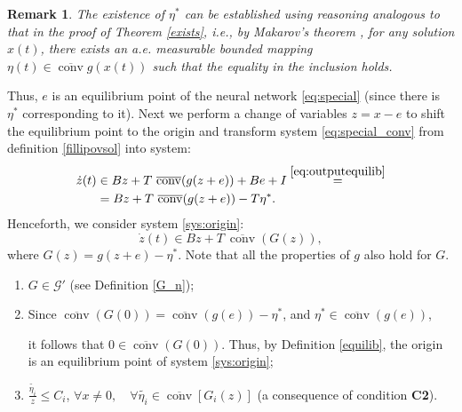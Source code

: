 \documentclass[journal]{IEEEtran}
\newtheorem{remark}{Remark}
\begin{document}
\begin{remark}
{The existence of $\eta^*$ can be established using reasoning analogous to that in the proof of Theorem \ref{exists}, 
i.e., by Makarov’s theorem \cite[p. 38, Th. 1.7]{Leonov}, for any solution $x(t)$, 
there exists an a.e. measurable bounded mapping $\eta(t) \in \overline{\operatorname{conv}}g(x(t))$ such that the equality in the inclusion holds.}
\end{remark}

Thus, $e$ is an equilibrium point of the neural network \eqref{eq:special} (since there is $\eta^*$ corresponding to it). 
Next we perform a change of variables $z=x-e$ to shift the equilibrium point to the origin and transform system \eqref{eq:special_conv} from definition \ref{fillipovsol} into system:
\[
\begin{aligned}
    \dot z(t) &\in Bz+ T~ \overline{\operatorname{conv}}(g(z+e))+Be+I\overset{\eqref{eq:outputequilib}}{=}\\
    &= Bz+T~ \overline{\operatorname{conv}}(g(z+e)) - T\eta^*.\\
\end{aligned}
\]
Henceforth, we consider system \eqref{sys:origin}:
\begin{equation}\label{sys:origin}
\dot z(t) \in Bz+T~ \overline{\operatorname{conv}}(G(z)),
\end{equation}
where $G(z)=g(z+e)-\eta^*$. Note that all the properties of $g$ also hold for $G$.

\begin{enumerate}
    \item $G\in \mathcal{G'}$ (see Definition \ref{G_n});
    
    \item Since $\overline{\operatorname{conv}}(G(0))=\overline{\operatorname{conv}}(g(e)) -\eta^*$, and $\eta^* \in \overline{\operatorname{conv}}(g(e))$, 
    
    it follows that $0 \in \overline{\operatorname{conv}}(G(0))$. Thus, by Definition \ref{equilib}, the origin is an equilibrium point of system \eqref{sys:origin};
    \item $ \frac{ \widetilde{\eta_i}}{z} \leqslant C_i $, $\forall x \ne 0, \quad \forall \widetilde{\eta_i} \in  \overline{\operatorname{conv}}[G_i(z)]$ (a consequence of condition \textbf{C2}).
\end{enumerate}
\end{document}
